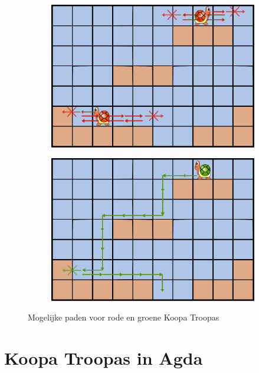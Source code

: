 \begin{figure}
  \centering
  \begin{subfigure}{0.49\textwidth}
    \includegraphics[width=\textwidth]{figures/koopatroopa-red}
  \end{subfigure}
  \begin{subfigure}{0.49\textwidth}
    \includegraphics[width=\textwidth]{figures/koopatroopa-green}
  \end{subfigure}
  \caption{Mogelijke paden voor rode en groene Koopa Troopas}
  \label{kooparedgreen}
\end{figure}


\section{Koopa Troopas in Agda}

